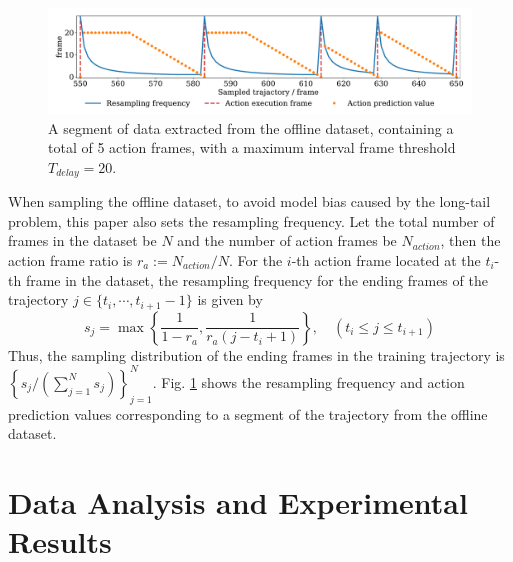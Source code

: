 \documentclass[runningheads]{llncs}
\begin{document}
\begin{figure}[htbp]
\centering
\includegraphics[width=\textwidth]{figures/resample_and_delay.pdf}
\caption{A segment of data extracted from the offline dataset,
containing a total of 5 action frames, with a maximum interval frame threshold $T_{delay} = 20$.}\label{fig-resample-and-delay}
\end{figure}
\noindent When sampling the offline dataset, to avoid model bias caused by the long-tail problem,
this paper also sets the resampling frequency.
Let the total number of frames in the dataset be $N$ and the number of action frames be $N_{action}$,
then the action frame ratio is $r_a := N_{action} / N$.
For the $i$-th action frame located at the $t_i$-th frame in the dataset,
the resampling frequency for the ending frames of the trajectory $j \in \{t_{i}, \cdots, t_{i+1}-1\}$ is given by
\begin{equation}\label{eq-resample-freq}
s_j = \max\left\{\frac{1}{1-r_a}, \frac{1}{r_a(j-t_i+1)}\right\}, \quad (t_i \leqslant j \leqslant t_{i+1})
\end{equation}
Thus, the sampling distribution of the ending frames in the training trajectory is $\left\{s_j/\left(\sum_{j=1}^{N}s_j\right)\right\}_{j=1}^N$.
Fig. \ref{fig-resample-and-delay} shows the resampling frequency and action prediction values corresponding to a segment of the trajectory from the offline dataset.

\section{Data Analysis and Experimental Results}
\end{document}
